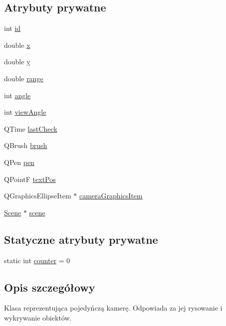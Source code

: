 \subsection*{Atrybuty prywatne}
\begin{DoxyCompactItemize}
\item 
int \hyperlink{class_camera_a4777e12d1a1138468a2d9023d8bff4ec}{id}
\item 
double \hyperlink{class_camera_aebcfa32751541de5c3523a18bb70c0eb}{x}
\item 
double \hyperlink{class_camera_ab1cd623bebcb4d23871b8b49231f808a}{y}
\item 
double \hyperlink{class_camera_aa4b50520b479a3051294e9c1355c597e}{range}
\item 
int \hyperlink{class_camera_af03876fc053f6ec72bab934db895a3bf}{angle}
\item 
int \hyperlink{class_camera_a837aff0494c895ffbb77bc9feb8f19b4}{view\-Angle}
\item 
Q\-Time \hyperlink{class_camera_ae95d988bf5dfede5627543ee14eae612}{last\-Check}
\item 
Q\-Brush \hyperlink{class_camera_a42fec17d586950465bc8b04e72654462}{brush}
\item 
Q\-Pen \hyperlink{class_camera_a0c4a7357bafc01ddcd838bc17738131b}{pen}
\item 
Q\-Point\-F \hyperlink{class_camera_ab18e82e118c2f58109a04ea1def3355c}{text\-Pos}
\item 
Q\-Graphics\-Ellipse\-Item $\ast$ \hyperlink{class_camera_afe62e86c4583ff405bf04251b56d38d0}{camera\-Graphics\-Item}
\item 
\hyperlink{class_scene}{Scene} $\ast$ \hyperlink{class_camera_a7e1604c078852fe16c23bf0578d2530b}{scene}
\end{DoxyCompactItemize}
\subsection*{Statyczne atrybuty prywatne}
\begin{DoxyCompactItemize}
\item 
static int \hyperlink{class_camera_a26c98856bed4d250d0b042f71881b42c}{counter} = 0
\end{DoxyCompactItemize}


\subsection{Opis szczegółowy}
Klasa reprezentująca pojedyńczą kamerę. Odpowiada za jej rysowanie i wykrywanie obiektów. 

